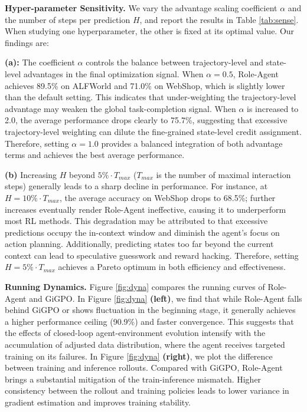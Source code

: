 \documentclass{llmxive}
\begin{document}
\noindent\textbf{Hyper-parameter Sensitivity.} We vary the advantage scaling coefficient $\alpha$ and the number of steps per prediction $H$, and report the results in Table \ref{tab:sense}. When studying one hyperparameter, the other is fixed at its optimal value. Our findings are:

\textbf{(a):} The coefficient $\alpha$ controls the balance between trajectory-level and state-level advantages in the final optimization signal. When $\alpha=0.5$, Role-Agent achieves 89.5\% on ALFWorld and 71.0\% on WebShop, which is slightly lower than the default setting. This indicates that under-weighting the trajectory-level advantage may weaken the global task-completion signal. When $\alpha$ is increased to 2.0, the average performance drops clearly to 75.7\%, suggesting that excessive trajectory-level weighting can dilute the fine-grained state-level credit assignment. Therefore, setting $\alpha=1.0$ provides a balanced integration of both advantage terms and achieves the best average performance.




\textbf{(b)} Increasing $H$ beyond $5\%\cdot T_{max}$ ($T_{max}$ is the number of maximal interaction steps) generally leads to a sharp decline in performance. For instance, at $H\!\!=\!\!10\%\cdot T_{max}$, the average accuracy on WebShop drops to 68.5\%; further increases eventually render Role-Agent ineffective, causing it to underperform most RL methods. This degradation may be attributed to that excessive predictions occupy the in-context window and diminish the agent's focus on action planning. Additionally, predicting states too far beyond the current context can lead to speculative guesswork and reward hacking. Therefore, setting $H\!\!=\!\!5\%\cdot T_{max}$ achieves a Pareto optimum in both efficiency and effectiveness.



\noindent\textbf{Running Dynamics.} Figure \ref{fig:dyna} compares the running curves of Role-Agent and GiGPO. In Figure \ref{fig:dyna} \textbf{(left)}, we find that while Role-Agent falls behind GiGPO or shows fluctuation in the beginning stage, it generally achieves a higher performance ceiling (90.9\%) and faster convergence. This suggests that the effects of closed-loop agent-environment evolution intensify with the accumulation of adjusted data distribution, where the agent receives targeted training on its failures. In Figure \ref{fig:dyna} \textbf{(right)}, we plot the difference between training and inference rollouts. Compared with GiGPO, Role-Agent brings a substantial mitigation of the train-inference mismatch. Higher consistency between the rollout and training policies leads to lower variance in gradient estimation and improves training stability.
\end{document}
